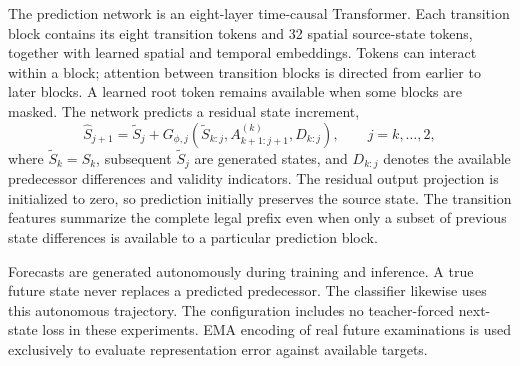 The prediction network is an eight-layer time-causal Transformer. Each transition block contains its eight transition tokens and 32 spatial source-state tokens, together with learned spatial and temporal embeddings. Tokens can interact within a block; attention between transition blocks is directed from earlier to later blocks. A learned root token remains available when some blocks are masked. The network predicts a residual state increment,
\begin{equation}
 \widehat S_{j+1}=\widetilde S_j+
 G_{\phi,j}\!\left(\widetilde S_{k:j},A_{k+1:j+1}^{(k)},D_{k:j}\right),
 \qquad j=k,\ldots,2,
\end{equation}
where $\widetilde S_k=S_k$, subsequent $\widetilde S_j$ are generated states, and $D_{k:j}$ denotes the available predecessor differences and validity indicators. The residual output projection is initialized to zero, so prediction initially preserves the source state. The transition features summarize the complete legal prefix even when only a subset of previous state differences is available to a particular prediction block.

Forecasts are generated autonomously during training and inference. A true future state never replaces a predicted predecessor. The classifier likewise uses this autonomous trajectory. The configuration includes no teacher-forced next-state loss in these experiments. EMA encoding of real future examinations is used exclusively to evaluate representation error against available targets.

